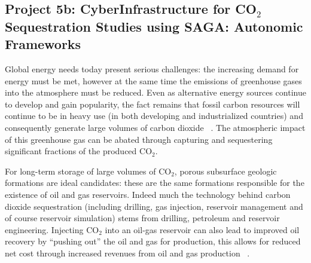 \documentclass[a4paper,10pt]{article}
\newcommand{\up}{\vspace*{-1em}}
\begin{document}
\up
\subsection*{Project 5b: CyberInfrastructure for CO$_2$ Sequestration Studies using SAGA: Autonomic Frameworks}
\up
Global energy needs today present serious challenges: the increasing demand for energy must be met, 
however at the same time the emissions of greenhouse gases into the atmosphere must be reduced. 
Even as alternative energy sources continue to develop and gain popularity, the fact remains that 
fossil carbon resources will continue to be in heavy use (in both developing and industrialized 
countries) and consequently generate large volumes of carbon dioxide ~\cite{GeoRPT,Pawar}. The 
atmospheric impact of this greenhouse gas can be abated through capturing and sequestering 
significant fractions of the produced CO$_2$.

For long-term storage of large volumes of CO$_2$, porous subsurface geologic formations are ideal 
candidates: these are the same formations responsible for the existence of oil and gas reservoirs. 
Indeed much the technology behind carbon dioxide sequestration (including drilling, gas injection, 
reservoir management and of course reservoir simulation) stems from drilling, petroleum and 
reservoir engineering. Injecting CO$_2$ into an oil-gas reservoir can also lead to improved oil 
recovery by ``pushing out'' the oil and gas for production, this allows for reduced net cost 
through increased revenues from oil and gas production ~\cite{EORBook}.

\end{document}
